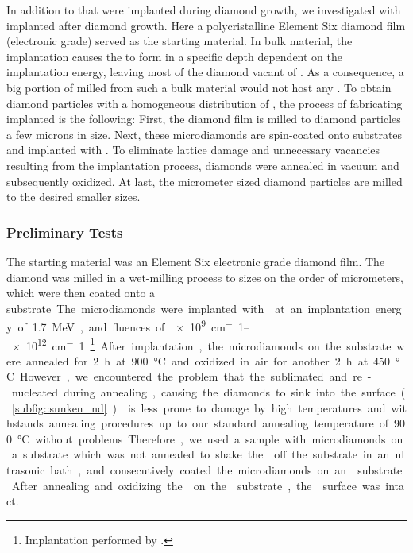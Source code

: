 	In addition to \sivs that were implanted during diamond growth, we investigated \nds with \sivs implanted after diamond growth.
	Here a polycristalline Element Six diamond film (electronic grade) served as the starting material.
	In bulk material, the implantation causes the \sivs to form in a specific depth dependent on the implantation energy, leaving most of the diamond vacant of \sivs.
	As a consequence, a big portion of \nds milled from such a bulk material would not host any \sivs.
	To obtain diamond particles with a homogeneous distribution of \sivs, the process of fabricating implanted \nds is the following:
	First, the diamond film is milled to diamond particles a few microns in size.
	Next, these microdiamonds are spin-coated onto \ir substrates and implanted with .
	To eliminate lattice damage and unnecessary vacancies resulting from the implantation process, diamonds were annealed in vacuum and subsequently oxidized.
	At last, the micrometer sized diamond particles are milled to the desired smaller sizes.

	\subsubsection{Preliminary Tests}\label{subsubsec::preliminary_tests}

	The starting material was an Element Six electronic grade diamond film.
	The diamond was milled in a wet-milling process to sizes on the order of micrometers, which were then coated onto a \si substrate.
	The microdiamonds were implanted with  at an implantation energy of \SI{1.7}{MeV}, and fluences of \SIrange{e9}{e12}{cm^-1}\footnote{Implantation performed by \rogalla.}.
	After implantation, the microdiamonds on the \si substrate were annealed for \SI{2}{\hour} at \SI{900}{\celsius} and oxidized in air for another \SI{2}{\hour} at \SI{450}{\celsius}.
	However, we encountered the problem that the \si sublimated and re-nucleated during annealing, causing the diamonds to sink into the \si surface (\autoref{subfig::sunken_nd}).
	\Ir is less prone to damage by high temperatures and withstands annealing procedures up to our standard annealing temperature of \SI{900}{\celsius} without problems.
	Therefore, we used a sample with microdiamonds on a \si substrate which was not annealed to shake the \nds off the \si substrate in an ultrasonic bath, and consecutively coated the microdiamonds on an \ir substrate.
	After annealing and oxidizing the \nds on the \ir substrate, the \ir surface was intact.

